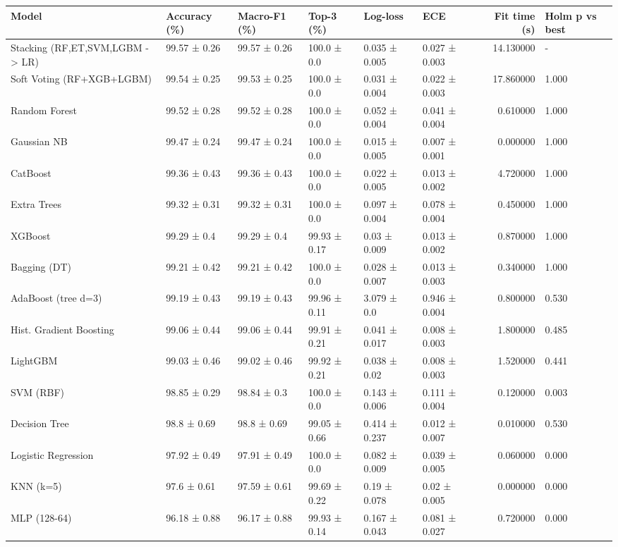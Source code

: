 \begin{tabular}{llllllrl}
\toprule
Model & Accuracy (\%) & Macro-F1 (\%) & Top-3 (\%) & Log-loss & ECE & Fit time (s) & Holm p vs best \\
\midrule
Stacking (RF,ET,SVM,LGBM -> LR) & 99.57 ± 0.26 & 99.57 ± 0.26 & 100.0 ± 0.0 & 0.035 ± 0.005 & 0.027 ± 0.003 & 14.130000 & - \\
Soft Voting (RF+XGB+LGBM) & 99.54 ± 0.25 & 99.53 ± 0.25 & 100.0 ± 0.0 & 0.031 ± 0.004 & 0.022 ± 0.003 & 17.860000 & 1.000 \\
Random Forest & 99.52 ± 0.28 & 99.52 ± 0.28 & 100.0 ± 0.0 & 0.052 ± 0.004 & 0.041 ± 0.004 & 0.610000 & 1.000 \\
Gaussian NB & 99.47 ± 0.24 & 99.47 ± 0.24 & 100.0 ± 0.0 & 0.015 ± 0.005 & 0.007 ± 0.001 & 0.000000 & 1.000 \\
CatBoost & 99.36 ± 0.43 & 99.36 ± 0.43 & 100.0 ± 0.0 & 0.022 ± 0.005 & 0.013 ± 0.002 & 4.720000 & 1.000 \\
Extra Trees & 99.32 ± 0.31 & 99.32 ± 0.31 & 100.0 ± 0.0 & 0.097 ± 0.004 & 0.078 ± 0.004 & 0.450000 & 1.000 \\
XGBoost & 99.29 ± 0.4 & 99.29 ± 0.4 & 99.93 ± 0.17 & 0.03 ± 0.009 & 0.013 ± 0.002 & 0.870000 & 1.000 \\
Bagging (DT) & 99.21 ± 0.42 & 99.21 ± 0.42 & 100.0 ± 0.0 & 0.028 ± 0.007 & 0.013 ± 0.003 & 0.340000 & 1.000 \\
AdaBoost (tree d=3) & 99.19 ± 0.43 & 99.19 ± 0.43 & 99.96 ± 0.11 & 3.079 ± 0.0 & 0.946 ± 0.004 & 0.800000 & 0.530 \\
Hist. Gradient Boosting & 99.06 ± 0.44 & 99.06 ± 0.44 & 99.91 ± 0.21 & 0.041 ± 0.017 & 0.008 ± 0.003 & 1.800000 & 0.485 \\
LightGBM & 99.03 ± 0.46 & 99.02 ± 0.46 & 99.92 ± 0.21 & 0.038 ± 0.02 & 0.008 ± 0.003 & 1.520000 & 0.441 \\
SVM (RBF) & 98.85 ± 0.29 & 98.84 ± 0.3 & 100.0 ± 0.0 & 0.143 ± 0.006 & 0.111 ± 0.004 & 0.120000 & 0.003 \\
Decision Tree & 98.8 ± 0.69 & 98.8 ± 0.69 & 99.05 ± 0.66 & 0.414 ± 0.237 & 0.012 ± 0.007 & 0.010000 & 0.530 \\
Logistic Regression & 97.92 ± 0.49 & 97.91 ± 0.49 & 100.0 ± 0.0 & 0.082 ± 0.009 & 0.039 ± 0.005 & 0.060000 & 0.000 \\
KNN (k=5) & 97.6 ± 0.61 & 97.59 ± 0.61 & 99.69 ± 0.22 & 0.19 ± 0.078 & 0.02 ± 0.005 & 0.000000 & 0.000 \\
MLP (128-64) & 96.18 ± 0.88 & 96.17 ± 0.88 & 99.93 ± 0.14 & 0.167 ± 0.043 & 0.081 ± 0.027 & 0.720000 & 0.000 \\
\bottomrule
\end{tabular}
